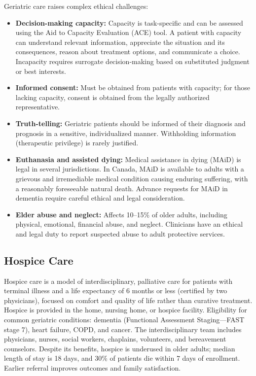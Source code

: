 Geriatric care raises complex ethical challenges:
\begin{itemize}[noitemsep]
  \item \textbf{Decision-making capacity:} Capacity is task-specific and can be assessed using the Aid to Capacity Evaluation (ACE) tool. A patient with capacity can understand relevant information, appreciate the situation and its consequences, reason about treatment options, and communicate a choice. Incapacity requires surrogate decision-making based on substituted judgment or best interests.
  \item \textbf{Informed consent:} Must be obtained from patients with capacity; for those lacking capacity, consent is obtained from the legally authorized representative.
  \item \textbf{Truth-telling:} Geriatric patients should be informed of their diagnosis and prognosis in a sensitive, individualized manner. Withholding information (therapeutic privilege) is rarely justified.
  \item \textbf{Euthanasia and assisted dying:} Medical assistance in dying (MAiD) is legal in several jurisdictions. In Canada, MAiD is available to adults with a grievous and irremediable medical condition causing enduring suffering, with a reasonably foreseeable natural death. Advance requests for MAiD in dementia require careful ethical and legal consideration.
  \item \textbf{Elder abuse and neglect:} Affects 10--15\% of older adults, including physical, emotional, financial abuse, and neglect. Clinicians have an ethical and legal duty to report suspected abuse to adult protective services.
\end{itemize}

\subsection{Hospice Care}
\label{sec:Hospice Care}

Hospice care is a model of interdisciplinary, palliative care for patients with terminal illness and a life expectancy of 6 months or less (certified by two physicians), focused on comfort and quality of life rather than curative treatment. Hospice is provided in the home, nursing home, or hospice facility. Eligibility for common geriatric conditions: dementia (Functional Assessment Staging---FAST stage 7), heart failure, COPD, and cancer. The interdisciplinary team includes physicians, nurses, social workers, chaplains, volunteers, and bereavement counselors. Despite its benefits, hospice is underused in older adults; median length of stay is 18 days, and 30\% of patients die within 7 days of enrollment. Earlier referral improves outcomes and family satisfaction.

